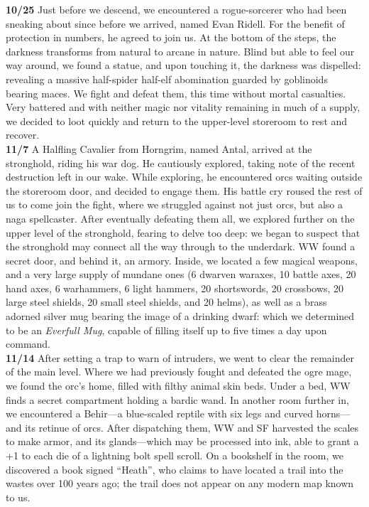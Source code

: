 \documentclass[letterpaper]{article}
\begin{document}
\noindent \textbf{10/25} Just before we descend, we encountered a rogue-sorcerer who had been sneaking about since before we arrived, named Evan Ridell. For the benefit of protection in numbers, he agreed to join us.  At the bottom of the steps, the darkness transforms from natural to arcane in nature.  Blind but able to feel our way around, we found a statue, and upon touching it, the darkness was dispelled: revealing a massive half-spider half-elf abomination guarded by goblinoids bearing maces. We fight and defeat them, this time without mortal casualties. Very battered and with neither magic nor vitality remaining in much of a supply, we decided to loot quickly and return to the upper-level storeroom to rest and recover.  \\

\noindent \textbf{11/7} A Halfling Cavalier from Horngrim, named Antal, arrived at the stronghold, riding his war dog.  He cautiously explored, taking note of the recent destruction left in our wake.  While exploring, he encountered orcs waiting outside the storeroom door, and decided to engage them.  His battle cry roused the rest of us to come join the fight, where we struggled against not just orcs, but also a naga spellcaster.  After eventually defeating them all, we explored further on the upper level of the stronghold, fearing to delve too deep: we began to suspect that the stronghold may connect all the way through to the underdark.  WW found a secret door, and behind it, an armory.  Inside, we located a few magical weapons, and a very large supply of mundane ones (6 dwarven waraxes, 10 battle axes, 20 hand axes, 6 warhammers, 6 light hammers, 20 shortswords, 20 crossbows, 20 large steel shields, 20 small steel shields, and 20 helms), as well as a brass adorned silver mug bearing the image of a drinking dwarf: which we determined to be an \emph{Everfull Mug}, capable of filling itself up to five times a day upon command. \\ 

\noindent \textbf{11/14} After setting a trap to warn of intruders, we went to clear the remainder of the main level.  Where we had previously fought and defeated the ogre mage, we found the orc's home, filled with filthy animal skin beds.  Under a bed, WW finds a secret compartment holding a bardic wand.  In another room further in, we encountered a Behir---a blue-scaled reptile with six legs and curved horns---and its retinue of orcs.  After dispatching them, WW and SF harvested the scales to make armor, and its glands---which may be processed into ink, able to grant a +1 to each die of a lightning bolt spell scroll. On a bookshelf in the room, we discovered a book signed ``Heath'', who claims to have located a trail into the wastes over 100 years ago; the trail does not appear on any modern map known to us. \\
\end{document}
